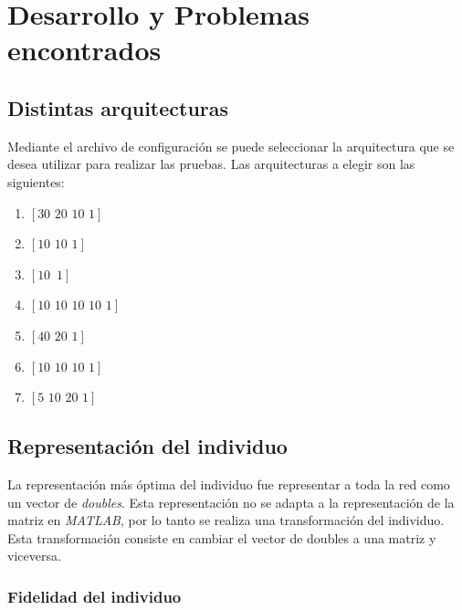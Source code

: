 \documentclass{sig-alternate}
\begin{document}
\section{Desarrollo y Problemas encontrados}

	\subsection{Distintas arquitecturas}

	Mediante el archivo de configuración se puede seleccionar la arquitectura que se desea utilizar para realizar las pruebas. Las arquitecturas a elegir son las siguientes:

	\begin{center}
		\begin{enumerate}
			\item $[30\,\,20\,\,10\,\,1]$
			\item $[10\,\,10\,\,1]$
			\item $[10\,\,\,1]$
			\item $[10\,\,10\,\,10\,\,10\,\,1]$
			\item $[40\,\,20\,\,1]$
			\item $[10\,\,10\,\,10\,\,1]$
			\item $[5\,\,10\,\,20\,\,1]$
		\end{enumerate}
	\end{center}

	\subsection{Representación del individuo}

	La representación más óptima del individuo fue representar a toda la red como un vector de \textit{doubles}. Esta representación no se adapta a la representación de la matriz en \textit{MATLAB}, por lo tanto se realiza una transformación del individuo. Esta transformación consiste en cambiar el vector de doubles a una matriz y viceversa.

	\subsubsection{Fidelidad del individuo}
\end{document}
